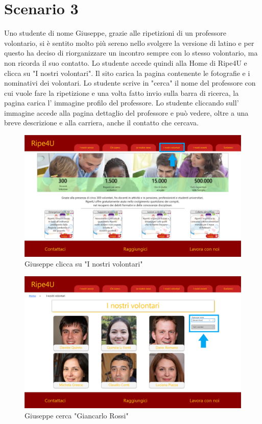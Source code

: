     \section{Scenario 3}
    Uno studente di nome Giuseppe, grazie alle ripetizioni di un professore
    volontario, si è sentito molto più sereno nello svolgere la versione di
    latino e per questo ha deciso di riorganizzare un incontro sempre con lo
    stesso volontario, ma non ricorda il suo contatto. Lo studente accede quindi
    alla Home di Ripe4U e clicca su "I nostri volontari". Il sito carica la
    pagina contenente le fotografie e i nominativi dei volontari. Lo studente
    scrive in "cerca" il nome del professore con cui vuole fare la ripetizione e
    una volta fatto invio sulla barra di ricerca, la pagina carica l'
    immagine profilo del professore. Lo studente cliccando sull' immagine
    accede alla pagina dettaglio del professore e può vedere, oltre a una breve
    descrizione e alla carriera, anche il contatto che cercava.
    \begin{figure}[H]
        \centering
        \includegraphics[scale=0.3]{resources/images/scenario3-1.png}
        \caption{Giuseppe clicca su "I nostri volontari"}
    \end{figure}
    \begin{figure}[H]
        \centering
        \includegraphics[scale=0.3]{resources/images/scenario3-2.png}
        \caption{Giuseppe cerca "Giancarlo Rossi"}
    \end{figure}
